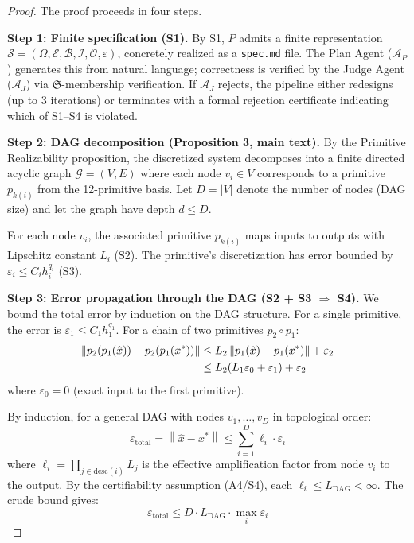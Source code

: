 \documentclass[11pt,a4paper]{article}
\newcommand{\Sclass}{\mathfrak{S}}
\newcommand{\norm}[1]{\left\|#1\right\|}
\newcommand{\Agent}{\mathcal{A}}
\newcommand{\Spec}{\mathcal{S}}
\newcommand{\Domain}{\Omega}
\begin{document}
\begin{proof}
The proof proceeds in four steps.

\textbf{Step 1: Finite specification (S1).}
By S1, $P$ admits a finite representation $\Spec = (\Domain, \mathcal{E}, \mathcal{B}, \mathcal{I}, \mathcal{O}, \varepsilon)$, concretely realized as a \texttt{spec.md} file. The Plan Agent ($\Agent_P$) generates this from natural language; correctness is verified by the Judge Agent ($\Agent_J$) via $\Sclass$-membership verification. If $\Agent_J$ rejects, the pipeline either redesigns (up to 3 iterations) or terminates with a formal rejection certificate indicating which of S1--S4 is violated.

\textbf{Step 2: DAG decomposition (Proposition 3, main text).}
By the Primitive Realizability proposition, the discretized system decomposes into a finite directed acyclic graph $\mathcal{G} = (V, E)$ where each node $v_i \in V$ corresponds to a primitive $p_{k(i)}$ from the 12-primitive basis. Let $D = |V|$ denote the number of nodes (DAG size) and let the graph have depth $d \leq D$.

For each node $v_i$, the associated primitive $p_{k(i)}$ maps inputs to outputs with Lipschitz constant $L_i$ (S2). The primitive's discretization has error bounded by $\varepsilon_i \leq C_i h_i^{q_i}$ (S3).

\textbf{Step 3: Error propagation through the DAG (S2 + S3 $\Rightarrow$ S4).}
We bound the total error by induction on the DAG structure. For a single primitive, the error is $\varepsilon_1 \leq C_1 h_1^{q_1}$. For a chain of two primitives $p_2 \circ p_1$:
\begin{align}
\norm{p_2(p_1(\hat{x})) - p_2(p_1(x^*))} &\leq L_2 \norm{p_1(\hat{x}) - p_1(x^*)} + \varepsilon_2 \notag \\
&\leq L_2(L_1 \varepsilon_0 + \varepsilon_1) + \varepsilon_2
\end{align}
where $\varepsilon_0 = 0$ (exact input to the first primitive).

By induction, for a general DAG with nodes $v_1, \ldots, v_D$ in topological order:
\begin{equation}
\label{eq:total_error}
\varepsilon_{\text{total}} = \norm{\hat{x} - x^*} \leq \sum_{i=1}^{D} \ell_i \cdot \varepsilon_i
\end{equation}
where $\ell_i = \prod_{j \in \text{desc}(i)} L_j$ is the effective amplification factor from node $v_i$ to the output. By the certifiability assumption (A4/S4), each $\ell_i \leq L_{\text{DAG}} < \infty$. The crude bound gives:
\begin{equation}
\varepsilon_{\text{total}} \leq D \cdot L_{\text{DAG}} \cdot \max_i \varepsilon_i
\end{equation}


\end{proof}
\end{document}
